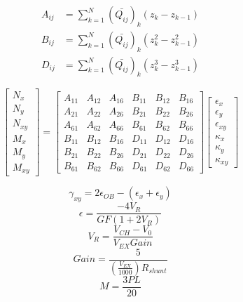 \documentclass[12pt]{article}
\begin{document}
\begin{align}
A_{ij}&=\sum_{k=1}^{N}\left(\bar{Q_{ij}}\right)_k(z_{k}-z_{k-1})\\
B_{ij}&=\sum_{k=1}^{N}\left(\bar{Q_{ij}}\right)_k(z_{k}^2-z_{k-1}^2)\\
D_{ij}&=\sum_{k=1}^{N}\left(\bar{Q_{ij}}\right)_k(z_{k}^3-z_{k-1}^3)
\end{align}

\begin{equation}
\left[\begin{matrix}
N_{x}\\ N_{y} \\ N_{xy} \\ M_{x} \\ M_{y} \\ M_{xy}
\end{matrix}\right] 
= \left[ \begin{matrix}
A_{11} & A_{12} & A_{16} & B_{11} & B_{12} & B_{16} \\ 
A_{21} & A_{22} & A_{26} & B_{21} & B_{22} & B_{26} \\
A_{61} & A_{62} & A_{66} & B_{61} & B_{62} & B_{66} \\
B_{11} & B_{12} & B_{16} & D_{11} & D_{12} & D_{16} \\
B_{21} & B_{22} & B_{26} & D_{21} & D_{22} & D_{26} \\
B_{61} & B_{62} & B_{66} & D_{61} & D_{62} & D_{66} 
\end{matrix} \right] \left[\begin{matrix}
\epsilon_{x}\\ \epsilon_{y} \\ \epsilon_{xy} \\ \kappa_{x} \\ \kappa_{y} \\ \kappa_{xy} 
\end{matrix} \right]
\end{equation}

 \begin{equation}
 \gamma_{xy} = 2\epsilon_{OB} -(\epsilon_{x}+\epsilon_{y})\label{eq:45Rosette}
\end{equation}
\begin{equation}
\epsilon =\frac{-4V_R}{GF(1 +2V_R)}\label{eq:Ve}
\end{equation}
\begin{equation}
V_{R} = \frac{V_{CH}-V_{0}}{V_{EX} Gain}\label{eq:Vr}
\end{equation}
\begin{equation}
Gain = \frac{5}{(\frac{V_{EX}}{1000}){R_{shunt}}}\label{eq:gain}
\end{equation}
\begin{equation}
M = \frac{3PL}{20}\label{eq:moment}
\end{equation}




\end{document}
